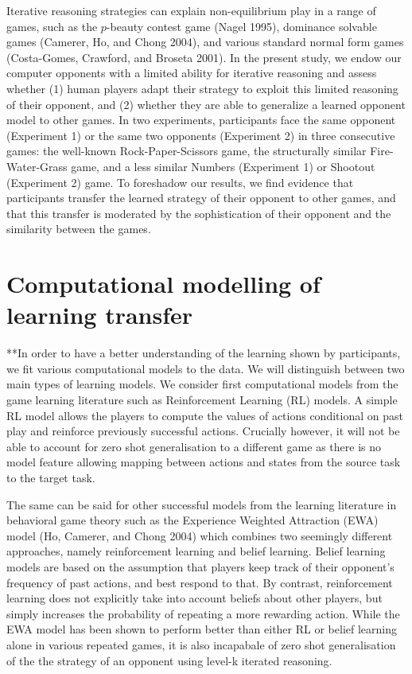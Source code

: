 \documentclass[smallextended]{svjour3}       %
\begin{document}
Iterative reasoning strategies can explain non-equilibrium play in a
range of games, such as the \(p\)-beauty contest game (Nagel 1995),
dominance solvable games (Camerer, Ho, and Chong 2004), and various
standard normal form games (Costa-Gomes, Crawford, and Broseta 2001). In
the present study, we endow our computer opponents with a limited
ability for iterative reasoning and assess whether (1) human players
adapt their strategy to exploit this limited reasoning of their
opponent, and (2) whether they are able to generalize a learned opponent
model to other games. In two experiments, participants face the same
opponent (Experiment 1) or the same two opponents (Experiment 2) in
three consecutive games: the well-known Rock-Paper-Scissors game, the
structurally similar Fire-Water-Grass game, and a less similar Numbers
(Experiment 1) or Shootout (Experiment 2) game. To foreshadow our
results, we find evidence that participants transfer the learned
strategy of their opponent to other games, and that this transfer is
moderated by the sophistication of their opponent and the similarity
between the games.

\hypertarget{computational-modelling-of-learning-transfer}{%
\section{Computational modelling of learning
transfer}\label{computational-modelling-of-learning-transfer}}

**In order to have a better understanding of the learning shown by
participants, we fit various computational models to the data. We will
distinguish between two main types of learning models. We consider first
computational models from the game learning literature such as
Reinforcement Learning (RL) models. A simple RL model allows the players
to compute the values of actions conditional on past play and reinforce
previously successful actions. Crucially however, it will not be able to
account for zero shot generalisation to a different game as there is no
model feature allowing mapping between actions and states from the
source task to the target task.

The same can be said for other successful models from the learning
literature in behavioral game theory such as the Experience Weighted
Attraction (EWA) model (Ho, Camerer, and Chong 2004) which combines two
seemingly different approaches, namely reinforcement learning and belief
learning. Belief learning models are based on the assumption that
players keep track of their opponent's frequency of past actions, and
best respond to that. By contrast, reinforcement learning does not
explicitly take into account beliefs about other players, but simply
increases the probability of repeating a more rewarding action. While
the EWA model has been shown to perform better than either RL or belief
learning alone in various repeated games, it is also incapabale of zero
shot generalisation of the the strategy of an opponent using level-k
iterated reasoning.
\end{document}
